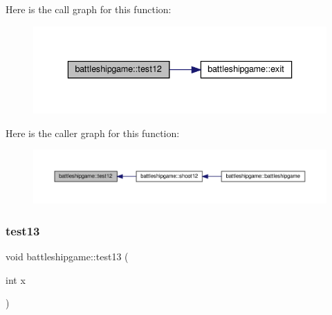 Here is the call graph for this function\+:
\nopagebreak
\begin{figure}[H]
\begin{center}
\leavevmode
\includegraphics[width=336pt]{classbattleshipgame_a801729b71aadc28bf27a2cdf9863a0f2_cgraph}
\end{center}
\end{figure}
Here is the caller graph for this function\+:
\nopagebreak
\begin{figure}[H]
\begin{center}
\leavevmode
\includegraphics[width=350pt]{classbattleshipgame_a801729b71aadc28bf27a2cdf9863a0f2_icgraph}
\end{center}
\end{figure}
\mbox{\label{classbattleshipgame_a2b71aca6916fc24986574cc5282cc6b1}} 
\subsubsection{\texorpdfstring{test13}{test13}}
{\footnotesize\ttfamily void battleshipgame\+::test13 (\begin{DoxyParamCaption}\item[{int}]{x }\end{DoxyParamCaption})\hspace{0.3cm}{\ttfamily [slot]}}

